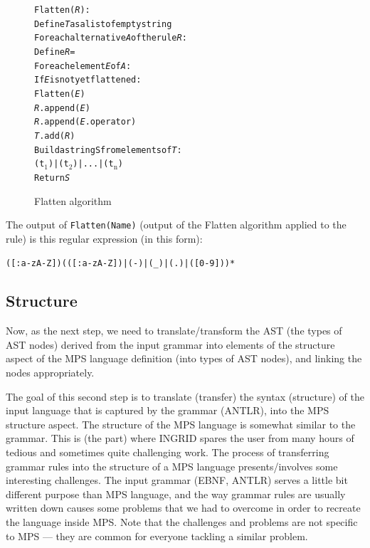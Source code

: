 \begin{figure}[ht]
\centering
\begin{framed}
\begin{alltt}
Flatten(\textit{R}):
  Define \textit{T} as a list of empty string
  For each alternative \textit{A} of the rule \textit{R}:
    Define \textit{R} = \antlrap\antlrap
    For each element \textit{E} of \textit{A}:
	  If \textit{E} is not yet flattened:
	    Flatten(\textit{E})
      \textit{R}.append(\textit{E})
      \textit{R}.append(\textit{E}.operator)
    \textit{T}.add(\textit{R})
  Build a string S from elements of \textit{T}:
    (t$_{\text{1}}$)|(t$_{\text{2}}$)|...|(t$_{\text{n}}$)
  Return \textit{S}
\end{alltt}
\end{framed}
\caption{Flatten algorithm}
\label{fig:algflatten}
\end{figure}

The output of \texttt{Flatten(Name)} (output of the Flatten algorithm applied to the  rule) is this regular expression (in this form):

\begin{center}
	\texttt{([:a-zA-Z])(([:a-zA-Z])|(-)|({\_})|(.)|([0-9]))*}
\end{center}

\subsection{Structure}

Now, as the next step, we need to translate/transform the AST (the types of AST nodes) derived from the input grammar into elements of the structure aspect of the MPS language definition (into types of AST nodes), and linking the nodes appropriately.

The goal of this second step is to translate (transfer) the syntax (structure) of the input language that is captured by the grammar (ANTLR), into the MPS structure aspect.
The structure of the MPS language is somewhat similar to the grammar.
This is (the part) where INGRID spares the user from many hours of tedious and sometimes quite challenging work.
The process of transferring grammar rules into the structure of a MPS language presents/involves some interesting challenges.
The input grammar (EBNF, ANTLR) serves a little bit different purpose than MPS language, and the way grammar rules are usually written down causes some problems that we had to overcome in order to recreate the language inside MPS.
Note that the challenges and problems are not specific to MPS --- they are common for everyone tackling a similar problem.


